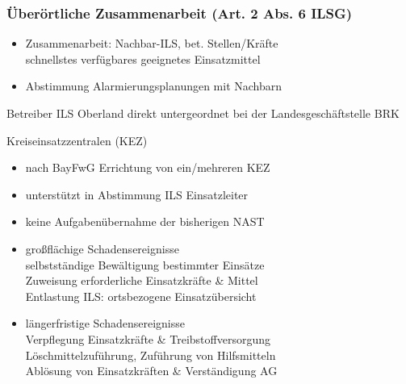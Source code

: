\begin{normbox}{\subsubsection{Überörtliche Zusammenarbeit (Art. 2 Abs. 6 ILSG)}}
    \begin{itemize}
        \item Zusammenarbeit: Nachbar-ILS, bet. Stellen/Kräfte\\
        \ra schnellstes verfügbares geeignetes Einsatzmittel
        \item Abstimmung Alarmierungsplanungen mit Nachbarn
    \end{itemize}
\end{normbox}
\begin{warningbox}{Betreiber ILS Oberland}
    direkt untergeordnet bei der Landesgeschäftstelle BRK
\end{warningbox}
 \begin{sectionbox}{Kreiseinsatzzentralen (KEZ)}
    \begin{itemize}
        \item nach BayFwG Errichtung von ein/mehreren KEZ
        \item unterstützt in Abstimmung ILS Einsatzleiter
        \item keine Aufgabenübernahme der bisherigen NAST
        \item großflächige Schadensereignisse\\
        \ra selbstständige Bewältigung bestimmter Einsätze\\
        \ra Zuweisung erforderliche Einsatzkräfte \& Mittel\\
        \ra Entlastung ILS: ortsbezogene Einsatzübersicht
        \item längerfristige Schadensereignisse\\
        \ra Verpflegung Einsatzkräfte \& Treibstoffversorgung\\
        \ra Löschmittelzuführung, Zuführung von Hilfsmitteln\\
        \ra Ablösung von Einsatzkräften \& Verständigung AG
    \end{itemize}
\end{sectionbox}